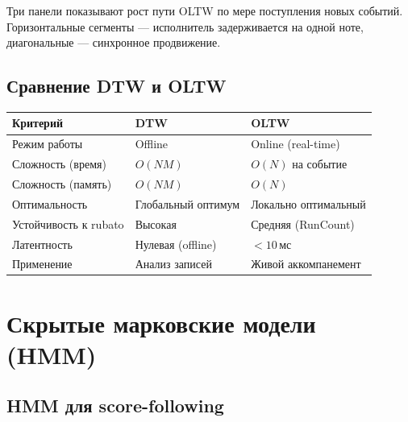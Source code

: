 \documentclass[a4paper,11pt]{article}
\begin{document}
Три панели показывают рост пути OLTW по мере поступления новых событий.
Горизонтальные сегменты --- исполнитель задерживается на одной ноте,
диагональные --- синхронное продвижение.

\subsection{Сравнение DTW и OLTW}

\begin{center}
\begin{tcolorbox}[
  enhanced, breakable,
  colback=pastelteal!8,
  colframe=pastelteal!50!black,
  sharp corners,
  boxrule=0.6pt,
  title={\bfseries Сравнение DTW и OLTW},
  fonttitle=\bfseries,
  attach boxed title to top left={yshift=-2mm, xshift=5mm},
  boxed title style={colback=pastelteal!50!black, sharp corners}
]
\begin{tabularx}{\textwidth}{lXX}
\toprule
\textbf{Критерий} & \textbf{DTW} & \textbf{OLTW} \\
\midrule
Режим работы & Offline & Online (real-time) \\
Сложность (время) & $O(NM)$ & $O(N)$ на событие \\
Сложность (память) & $O(NM)$ & $O(N)$ \\
Оптимальность & Глобальный оптимум & Локально оптимальный \\
Устойчивость к rubato & Высокая & Средняя (RunCount) \\
Латентность & Нулевая (offline) & $< 10$\,мс \\
Применение & Анализ записей & Живой аккомпанемент \\
\bottomrule
\end{tabularx}
\end{tcolorbox}
\end{center}


\section{Скрытые марковские модели (HMM)}
\label{sec:hmm}

\subsection{HMM для score-following}
\end{document}

